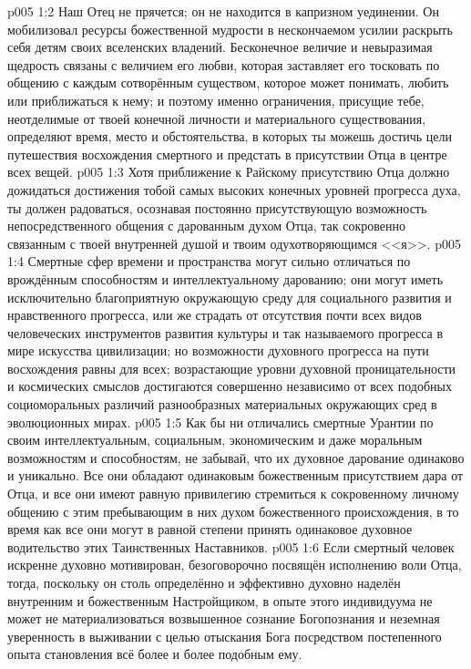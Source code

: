\vs p005 1:2 Наш Отец не прячется; он не находится в капризном уединении. Он мобилизовал ресурсы божественной мудрости в нескончаемом усилии раскрыть себя детям своих вселенских владений. Бесконечное величие и невыразимая щедрость связаны с величием его любви, которая заставляет его тосковать по общению с каждым сотворённым существом, которое может понимать, любить или приближаться к нему; и поэтому именно ограничения, присущие тебе, неотделимые от твоей конечной личности и материального существования, определяют время, место и обстоятельства, в которых ты можешь достичь цели путешествия восхождения смертного и предстать в присутствии Отца в центре всех вещей.
\vs p005 1:3 \pc Хотя приближение к Райскому присутствию Отца должно дожидаться достижения тобой самых высоких конечных уровней прогресса духа, ты должен радоваться, осознавая постоянно присутствующую возможность непосредственного общения с дарованным духом Отца, так сокровенно связанным с твоей внутренней душой и твоим одухотворяющимся <<я>>.
\vs p005 1:4 Смертные сфер времени и пространства могут сильно отличаться по врождённым способностям и интеллектуальному дарованию; они могут иметь исключительно благоприятную окружающую среду для социального развития и нравственного прогресса, или же страдать от отсутствия почти всех видов человеческих инструментов развития культуры и так называемого прогресса в мире искусства цивилизации; но возможности духовного прогресса на пути восхождения равны для всех; возрастающие уровни духовной проницательности и космических смыслов достигаются совершенно независимо от всех подобных социоморальных различий разнообразных материальных окружающих сред в эволюционных мирах.
\vs p005 1:5 Как бы ни отличались смертные Урантии по своим интеллектуальным, социальным, экономическим и даже моральным возможностям и способностям, не забывай, что их духовное дарование одинаково и уникально. Все они обладают одинаковым божественным присутствием дара от Отца, и все они имеют равную привилегию стремиться к сокровенному личному общению с этим пребывающим в них духом божественного происхождения, в то время как все они могут в равной степени принять одинаковое духовное водительство этих Таинственных Наставников.
\vs p005 1:6 \pc Если смертный человек искренне духовно мотивирован, безоговорочно посвящён исполнению воли Отца, тогда, поскольку он столь определённо и эффективно духовно наделён внутренним и божественным Настройщиком, в опыте этого индивидуума не может не материализоваться возвышенное сознание Богопознания и неземная уверенность в выживании с целью отыскания Бога посредством постепенного опыта становления всё более и более подобным ему.
